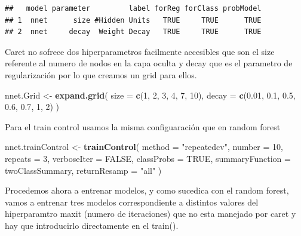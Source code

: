 \documentclass[
]{article}
\newenvironment{Shaded}{\begin{snugshade}}{\end{snugshade}}
\newcommand{\AttributeTok}[1]{\textcolor[rgb]{0.13,0.29,0.53}{#1}}
\newcommand{\ConstantTok}[1]{\textcolor[rgb]{0.56,0.35,0.01}{#1}}
\newcommand{\DecValTok}[1]{\textcolor[rgb]{0.00,0.00,0.81}{#1}}
\newcommand{\FloatTok}[1]{\textcolor[rgb]{0.00,0.00,0.81}{#1}}
\newcommand{\FunctionTok}[1]{\textcolor[rgb]{0.13,0.29,0.53}{\textbf{#1}}}
\newcommand{\NormalTok}[1]{#1}
\newcommand{\OtherTok}[1]{\textcolor[rgb]{0.56,0.35,0.01}{#1}}
\newcommand{\StringTok}[1]{\textcolor[rgb]{0.31,0.60,0.02}{#1}}
\begin{document}
\begin{verbatim}
##   model parameter         label forReg forClass probModel
## 1  nnet      size #Hidden Units   TRUE     TRUE      TRUE
## 2  nnet     decay  Weight Decay   TRUE     TRUE      TRUE
\end{verbatim}

Caret no sofrece dos hiperparametros facilmente accesibles que son el
size referente al numero de nodos en la capa oculta y decay que es el
parametro de regularización por lo que creamos un grid para ellos.

\begin{Shaded}
\begin{Highlighting}[]
\NormalTok{nnet.Grid }\OtherTok{\textless{}{-}} \FunctionTok{expand.grid}\NormalTok{(}
  \AttributeTok{size =} \FunctionTok{c}\NormalTok{(}\DecValTok{1}\NormalTok{, }\DecValTok{2}\NormalTok{, }\DecValTok{3}\NormalTok{, }\DecValTok{4}\NormalTok{, }\DecValTok{7}\NormalTok{, }\DecValTok{10}\NormalTok{),}
  \AttributeTok{decay =} \FunctionTok{c}\NormalTok{(}\FloatTok{0.01}\NormalTok{, }\FloatTok{0.1}\NormalTok{, }\FloatTok{0.5}\NormalTok{, }\FloatTok{0.6}\NormalTok{, }\FloatTok{0.7}\NormalTok{, }\DecValTok{1}\NormalTok{, }\DecValTok{2}\NormalTok{)}
\NormalTok{)}
\end{Highlighting}
\end{Shaded}

Para el train control usamos la misma configuaración que en random
forest

\begin{Shaded}
\begin{Highlighting}[]
\NormalTok{nnet.trainControl }\OtherTok{\textless{}{-}} \FunctionTok{trainControl}\NormalTok{(}
  \AttributeTok{method =} \StringTok{"repeatedcv"}\NormalTok{,}
  \AttributeTok{number =} \DecValTok{10}\NormalTok{,}
  \AttributeTok{repeats =} \DecValTok{3}\NormalTok{,}
  \AttributeTok{verboseIter =} \ConstantTok{FALSE}\NormalTok{,}
  \AttributeTok{classProbs =} \ConstantTok{TRUE}\NormalTok{,}
  \AttributeTok{summaryFunction =}\NormalTok{ twoClassSummary,}
  \AttributeTok{returnResamp =} \StringTok{"all"}
\NormalTok{)}
\end{Highlighting}
\end{Shaded}

Procedemos ahora a entrenar modelos, y como sucedica con el random
forest, vamos a entrenar tres modelos correspondiente a distintos
valores del hiperparamtro maxit (numero de iteraciones) que no esta
manejado por caret y hay que introducirlo directamente en el train().
\end{document}

